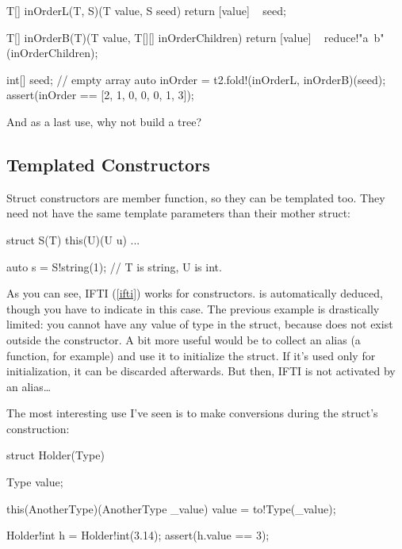 \begin{dcode}
T[] inOrderL(T, S)(T value, S seed)
{
    return [value] ~ seed;
}

T[] inOrderB(T)(T value, T[][] inOrderChildren)
{
    return [value]  ~  reduce!"a~b"(inOrderChildren);
}

int[] seed; // empty array
auto inOrder = t2.fold!(inOrderL, inOrderB)(seed);
assert(inOrder == [2, 1, 0, 0, 0, 1, 3]);
\end{dcode}

And as a last use, why not build a tree? 


\subsection{Templated Constructors}\label{constructortemplates}

Struct constructors are member function, so they can be templated too. They need not have the same template parameters than their mother struct:

\begin{dcode}
struct S(T)
{
    this(U)(U u) { ... }
}

auto s = S!string(1); // T is string, U is int.
\end{dcode}

As you can see, IFTI (\ref{ifti}) works for constructors.  is automatically deduced, though you have to indicate  in this case. The previous example is drastically limited: you cannot have any value of type  in the struct, because  does not exist outside the constructor. A bit more useful would be to collect an alias (a function, for example) and use it to initialize the struct. If it's used only for initialization, it can be discarded afterwards. But then, IFTI is not activated by an alias\ldots

The most interesting use I've seen is to make conversions during the struct's construction:

\begin{dcode}
struct Holder(Type)
{
    Type value;

    this(AnotherType)(AnotherType _value)
    {
        value = to!Type(_value);
    }
}

Holder!int h = Holder!int(3.14);
assert(h.value == 3);
\end{dcode}

